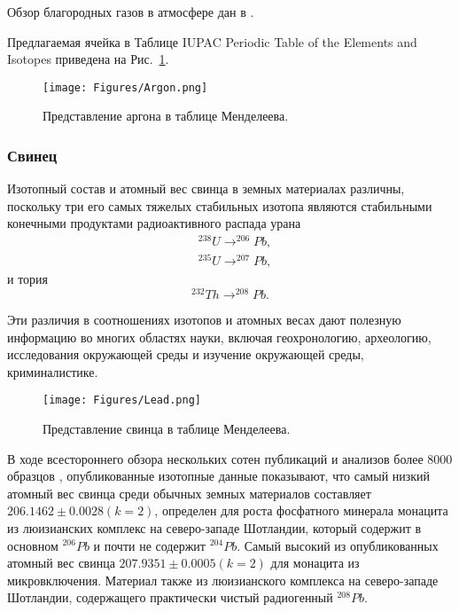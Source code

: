 \documentclass[a5paper,openany]{book}
\begin{document}
Обзор благородных газов в атмосфере дан в  \cite{NobleGasesTracers}.


Предлагаемая ячейка в Таблице IUPAC Periodic Table of the Elements and Isotopes \cite{IPTEI} приведена на Рис.~\ref{f:Argon}.

\begin{figure}[ht] 
	\centering\small
	\texttt{[image: Figures/Argon.png]}
	\caption{Представление аргона в таблице Менделеева.} 
	\label{f:Argon}
\end{figure}


\subsubsection{Свинец} \label{s:Lead}

Изотопный состав и атомный вес свинца в земных материалах различны, поскольку три его самых тяжелых стабильных изотопа являются стабильными конечными продуктами радиоактивного распада урана 
\begin{align}
	& ^{238}U \longrightarrow ^{206}Pb,  \\ 
	& ^{235}U \longrightarrow ^{207}Pb, 
\end{align}
и тория 
\begin{equation}
	^{232}Th \longrightarrow ^{208}Pb.
\end{equation}

Эти различия в соотношениях изотопов и атомных весах дают полезную информацию во многих областях науки, включая геохронологию, археологию, исследования окружающей среды и изучение окружающей среды, криминалистике.

\begin{figure}[ht] 
	\centering\small
	\texttt{[image: Figures/Lead.png]}
	\caption{Представление свинца в таблице Менделеева.} 
	\label{f:Lead}
\end{figure}

В ходе всестороннего обзора нескольких сотен публикаций и анализов более 8000 образцов \cite{IUPACLead},
опубликованные изотопные данные показывают, что самый низкий атомный вес свинца среди обычных земных материалов составляет
$206.1462\pm 0.0028 (k = 2)$,
определен для роста фосфатного минерала монацита из люизианских
комплекс на северо-западе Шотландии, который содержит в основном $^{206}Pb$ и почти не содержит $^{204}Pb$. Самый высокий из опубликованных
атомный вес свинца $207.9351 \pm 0.0005 (k = 2)$ для монацита из микровключения. Материал также
из люизианского комплекса на северо-западе Шотландии, содержащего практически чистый радиогенный $^{208}Pb$. 
\end{document}

